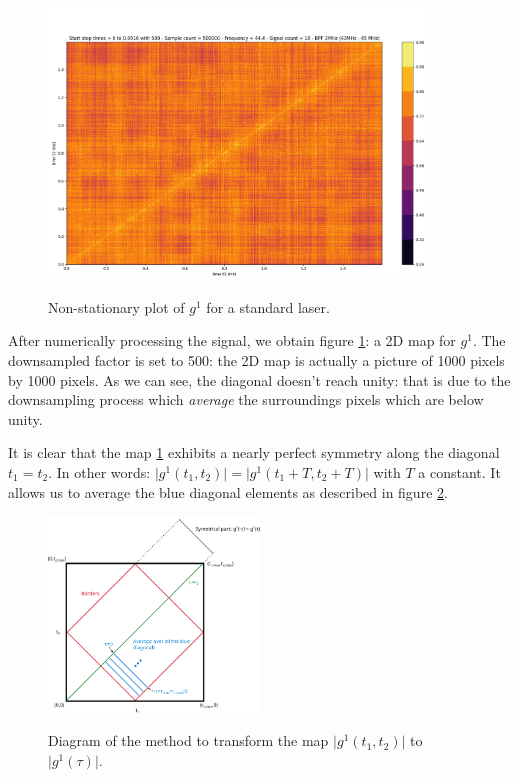 \documentclass[11pt]{report}
\begin{document}
\begin{figure}[h!]
\caption{Non-stationary plot of $g^1$ for a standard laser.}
\centering
\includegraphics[width=0.9\textwidth]{st-g12}
\label{fig:st-g12}
\end{figure}
After numerically processing the signal, we obtain figure \ref{fig:st-g12}: a 2D map for $g^1$. The downsampled factor is set to 500: the 2D map is actually a picture of 1000 pixels by 1000 pixels. As we can see, the diagonal doesn't reach unity: that is due to the downsampling process which \textit{average} the surroundings pixels which are below unity.

It is clear that the map \ref{fig:st-g12} exhibits a nearly perfect symmetry along the diagonal $t_1=t_2$. In other words: $\vert g^1(t_1, t_2) \vert = \vert g^1(t_1 + T, t_2 + T) \vert$ with $T$ a constant. It allows us to average the blue diagonal elements as described in figure \ref{fig:to-st}.

\begin{figure}[h!]
\caption{Diagram of the method to transform the map $\vert g^1(t_1, t_2) \vert$ to $\vert g^1(\tau) \vert$.}
\centering
\includegraphics[width=0.5\textwidth]{to-st}
\label{fig:to-st}
\end{figure}
\end{document}
